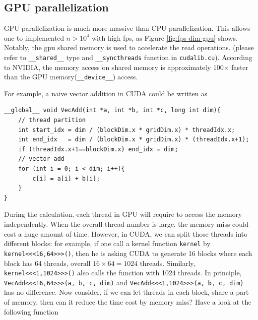 \documentclass[twoside,12pt]{article}
\theoremstyle{definition}
\theoremstyle{remark}
\begin{document}
\subsection{GPU parallelization}
GPU parallelization is much more massive than CPU parallelization.
This allows one to implemented $n>10^4$ with high fps, as Figure \ref{fig:fps-dim-gpu}
shows.
Notably, the gpu shared memory is used to accelerate the read operations.
(please refer to \lstinline|__shared__| type and \lstinline|__syncthreads| function
in \lstinline|cudalib.cu|).
According to NVIDIA, the memory access on shared memory is
approximately 100$\times$ faster than the GPU memory(\lstinline|__device__|) access.

For example, a naive vector addition in CUDA could be written as
\begin{lstlisting}[style=cpp]
__global__ void VecAdd(int *a, int *b, int *c, long int dim){
    // thread partition
    int start_idx = dim / (blockDim.x * gridDim.x) * threadIdx.x;
    int end_idx   = dim / (blockDim.x * gridDim.x) * (threadIdx.x+1);
    if (threadIdx.x+1==blockDim.x) end_idx = dim;
    // vector add
    for (int i = 0; i < dim; i++){
        c[i] = a[i] + b[i];
    }
}
\end{lstlisting}
During the calculation, each thread in GPU will require to
access the memory independently.
When the overall thread number is large, the memory miss could
cost a huge amount of time.
However, in CUDA, we can split those threads into different blocks:
for example, if one call a kernel function \lstinline|kernel|
by \lstinline|kernel<<<16,64>>>()|, then he is asking CUDA
to generate 16 blocks where each block has 64 threads, overall 
$16\times 64=1024$ threads.
Similarly, \lstinline|kernel<<<1,1024>>>()| also calls the function
with 1024 threads.
In principle, \lstinline|VecAdd<<<16,64>>>(a, b, c, dim)| and
\lstinline|VecAdd<<<1,1024>>>(a, b, c, dim)| has no difference.
Now consider, if we can let threads in each block, share a 
part of memory, then can it reduce the time cost by memory miss?
Have a look at the following function
\end{document}
